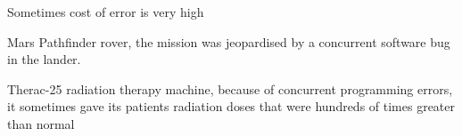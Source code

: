 \documentclass[12pt]{beamer}
\begin{document}
  \begin{frame}{Sometimes cost of error is very high}
      \begin{alertblock}{Mars Pathfinder}
          rover, the mission was jeopardised by a concurrent
          software bug in the lander. \cite{Pathfinder2013}
      \end{alertblock}
      \begin{alertblock}{Therac-25}
          radiation therapy machine, because of concurrent
          programming errors, it sometimes gave its patients radiation doses
          that were hundreds of times greater than normal \cite{wiki:therac}
      \end{alertblock}
  \end{frame}
\end{document}
